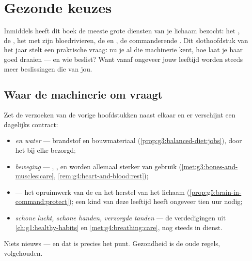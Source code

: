 \chapter{Gezonde keuzes}\label{ch:g5:healthy-choices}

Inmiddels heeft dit boek de meeste grote diensten van je lichaam
bezocht: het , de , het  met zijn
bloedrivieren, de  en , de commanderende . Dit
slothoofdstuk van het jaar stelt een praktische vraag: nu je al die
machinerie kent, hoe laat je haar goed draaien --- en wie beslist? Want
vanaf ongeveer jouw leeftijd worden steeds meer beslissingen die van jou.

\section{Waar de machinerie om vraagt}

\begin{proposition}\label{prop:g5:healthy-choices:contract}
Zet de verzoeken van de vorige hoofdstukken naast elkaar en er verschijnt
een dagelijks contract:
\begin{itemize}
  \item \emph{ en water} --- brandstof en bouwmateriaal
        (\cref{prop:g3:balanced-diet:jobs}), door het  bij elke 
        bezorgd;
  \item \emph{beweging} --- , ,  en  worden
        allemaal sterker van gebruik
        (\cref{met:g3:bones-and-muscles:care},
        \cref{rem:g4:heart-and-blood:rest});
  \item \emph{} --- het opruimwerk van de  en het herstel
        van het lichaam (\cref{prop:g5:brain-in-command:protect}); een
        kind van deze leeftijd heeft ongeveer tien uur nodig;
  \item \emph{schone lucht, schone handen, verzorgde tanden} --- de
        verdedigingen uit \cref{ch:g1:healthy-habits} en
        \cref{met:g4:breathing:care}, nog steeds in dienst.
\end{itemize}
Niets nieuws --- en dat is precies het punt. Gezondheid is de oude
regels, volgehouden.
\end{proposition}
\admitted

